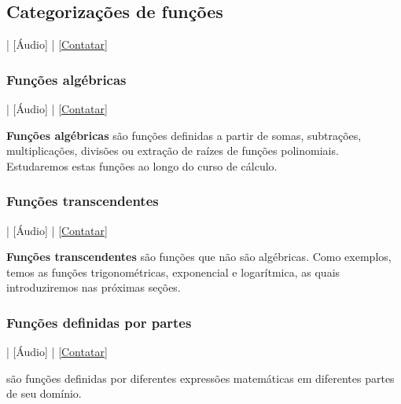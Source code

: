 \subsection{Categorizações de funções}

\begin{flushright}
  [Vídeo] | [Áudio] | \href{https://phkonzen.github.io/notas/contato.html}{[Contatar]}
\end{flushright}

\subsubsection{Funções algébricas}

\begin{flushright}
  [Vídeo] | [Áudio] | \href{https://phkonzen.github.io/notas/contato.html}{[Contatar]}
\end{flushright}

{\bf Funções algébricas} são funções definidas a partir de somas, subtrações, multiplicações, divisões ou extração de raízes de funções polinomiais. Estudaremos estas funções ao longo do curso de cálculo.

\subsubsection{Funções transcendentes}

\begin{flushright}
  [Vídeo] | [Áudio] | \href{https://phkonzen.github.io/notas/contato.html}{[Contatar]}
\end{flushright}

{\bf Funções transcendentes}{} são funções que não são algébricas. Como exemplos, temos as funções trigonométricas, exponencial e logarítmica, as quais introduziremos nas próximas seções.

\subsubsection{Funções definidas por partes}

\begin{flushright}
  [Vídeo] | [Áudio] | \href{https://phkonzen.github.io/notas/contato.html}{[Contatar]}
\end{flushright}

 são funções definidas por diferentes expressões matemáticas em diferentes partes de seu domínio.

